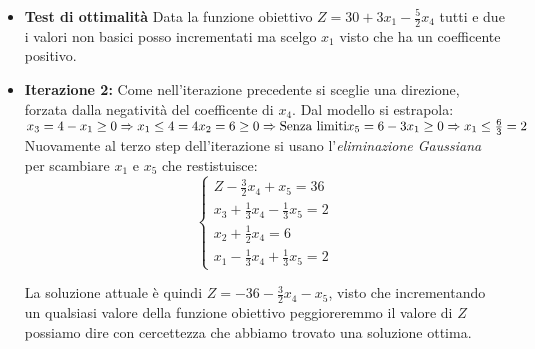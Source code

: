\documentclass{article}
\newcommand*\circled[1]{\tikz[baseline=(char.base)]{
            \node[shape=circle,draw,inner sep=1pt] (char) {#1};}}
\begin{document}
\begin{tcolorbox}[
    colback=lightgray,
    colframe=black,
    coltext=black,
    title=Algebra dell'esempio del simplesso,
    colbacktitle=black,
    coltitle=lightgray,
    breakable
  ]
\begin{itemize}
\begin{enumerate}
                  $$
                    \begin{cases}
                      Z-3x_1+\frac{5}{2}x_4=30 \\
                      x_1+x_3=4                \\
                      x_2 + \frac{1}{2}x_4=6   \\
                      3x_1-x_4+x_5=6
                    \end{cases}
                  $$

          \end{enumerate}
    \item \circled{2}\textbf{Test di ottimalità}
          Data la funzione obiettivo $Z=30+3x_1-\frac{5}{2}x_4$ tutti e due i valori non basici posso incrementati ma scelgo $x_1$ visto che ha un coefficente positivo.
    \item \textbf{Iterazione 2:}
          Come nell'iterazione precedente si sceglie una direzione, forzata dalla negatività del coefficente di $x_4$. Dal modello si estrapola:
          $ \\
            x_3=4-x_1 \ge 0 \Rightarrow x_1 \le 4 = 4 \\
            x_2 = 6 \ge 0 \Rightarrow \text{Senza limiti} \\
            x_5= 6-3x_1\ge0\Rightarrow x_1 \le \frac{6}{3} = 2\\
          $
          Nuovamente al terzo step dell'iterazione si usano l'\textit{eliminazione Gaussiana} per scambiare $x_1$ e $x_5$ che restistuisce:
          $$
            \begin{cases}
              Z-\frac{3}{2}x_4+x_5=36             \\
              x_3+\frac{1}{3}x_4-\frac{1}{3}x_5=2 \\
              x_2 + \frac{1}{2}x_4=6              \\
              x_1 -\frac{1}{3}x_4+\frac{1}{3}x_5=2
            \end{cases}
          $$

          La soluzione attuale è quindi $Z=-36-\frac{3}{2}x_4-x_5$, visto che incrementando un qualsiasi valore della funzione obiettivo peggioreremmo il valore di $Z$ possiamo dire con cercettezza che abbiamo trovato una soluzione ottima.
  \end{itemize}
\end{tcolorbox}
\end{document}
